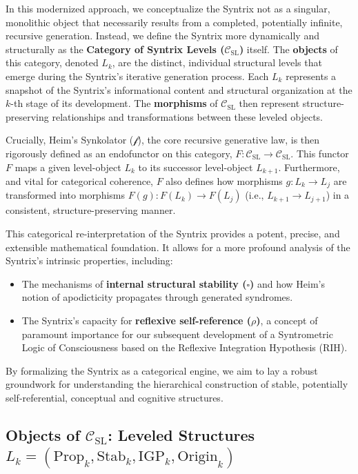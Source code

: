 \documentclass[
    12pt,              %
    a4paper,           %
    headings=normal,   %
    twoside=true,      %
    BCOR=8mm,          %
]{scrbook}
\newcommand{\synkolator}{\mathcal{f}}
\newcommand{\BoxSyn}{\square}
\begin{document}
In this modernized approach, we conceptualize the Syntrix not as a singular, monolithic object that necessarily results from a completed, potentially infinite, recursive generation. Instead, we define the Syntrix more dynamically and structurally as the \textbf{Category of Syntrix Levels (\(\mathcal{C}_{\text{SL}}\))} itself. The \textbf{objects} of this category, denoted \(L_k\), are the distinct, individual structural levels that emerge during the Syntrix's iterative generation process. Each \(L_k\) represents a snapshot of the Syntrix's informational content and structural organization at the \(k\)-th stage of its development. The \textbf{morphisms} of \(\mathcal{C}_{\text{SL}}\) then represent structure-preserving relationships and transformations between these leveled objects.

Crucially, Heim’s Synkolator (\(\synkolator\)), the core recursive generative law, is then rigorously defined as an endofunctor on this category, \(F: \mathcal{C}_{\text{SL}} \to \mathcal{C}_{\text{SL}}\). This functor \(F\) maps a given level-object \(L_k\) to its successor level-object \(L_{k+1}\). Furthermore, and vital for categorical coherence, \(F\) also defines how morphisms \(g: L_k \to L_j\) are transformed into morphisms \(F(g): F(L_k) \to F(L_j)\) (i.e., \(L_{k+1} \to L_{j+1}\)) in a consistent, structure-preserving manner.

This categorical re-interpretation of the Syntrix provides a potent, precise, and extensible mathematical foundation. It allows for a more profound analysis of the Syntrix's intrinsic properties, including:
\begin{itemize}
    \item   The mechanisms of \textbf{internal structural stability (\(\BoxSyn\))} and how Heim's notion of apodicticity propagates through generated syndromes.
    \item   The Syntrix's capacity for \textbf{reflexive self-reference (\(\rho\))}, a concept of paramount importance for our subsequent development of a Syntrometric Logic of Consciousness based on the Reflexive Integration Hypothesis (RIH).
\end{itemize}
By formalizing the Syntrix as a categorical engine, we aim to lay a robust groundwork for understanding the hierarchical construction of stable, potentially self-referential, conceptual and cognitive structures.

\subsection{Objects of \(\mathcal{C}_{\text{SL}}\): Leveled Structures \(L_k = ( \text{Prop}_k, \text{Stab}_k, \text{IGP}_k, \text{Origin}_k )\) }
\label{sec:ch2_objects_csl} 
\end{document}
